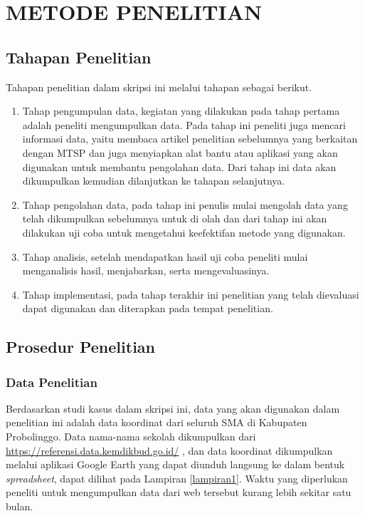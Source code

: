 \chapter{METODE PENELITIAN}

\section{Tahapan Penelitian}

Tahapan penelitian dalam skripsi ini melalui tahapan sebagai berikut.

\begin{enumerate}
	\item Tahap pengumpulan data, kegiatan yang dilakukan pada tahap pertama adalah peneliti mengumpulkan data. Pada tahap ini peneliti juga mencari informasi data, yaitu membaca artikel penelitian sebelumnya yang berkaitan dengan MTSP dan juga menyiapkan alat bantu atau aplikasi yang akan digunakan untuk membantu pengolahan data. Dari tahap ini data akan dikumpulkan kemudian dilanjutkan ke tahapan selanjutnya.
	\item Tahap pengolahan data, pada tahap ini penulis mulai mengolah data yang telah dikumpulkan sebelumnya untuk di olah dan dari tahap ini akan dilakukan uji coba untuk mengetahui keefektifan metode yang digunakan.
	\item Tahap analisis, setelah mendapatkan hasil uji coba peneliti mulai menganalisis hasil, menjabarkan, serta mengevaluasinya.
	\item Tahap implementasi, pada tahap terakhir ini penelitian yang telah dievaluasi dapat digunakan dan diterapkan pada tempat penelitian.
\end{enumerate}

\section{Prosedur Penelitian}


\subsection{Data Penelitian}
    
Berdasarkan studi kasus dalam skripsi ini, data yang akan digunakan dalam penelitian ini adalah data koordinat dari seluruh SMA di Kabupaten Probolinggo. Data nama-nama sekolah dikumpulkan dari \url{https://referensi.data.kemdikbud.go.id/} \cite{kemendikbud}, dan data koordinat dikumpulkan melalui aplikasi Google Earth \cite{googleearth} yang dapat diunduh langsung ke dalam bentuk \textit{spreadsheet}, dapat dilihat pada Lampiran \ref{lampiran1}. Waktu yang diperlukan peneliti untuk mengumpulkan data dari web tersebut kurang lebih sekitar satu bulan.

